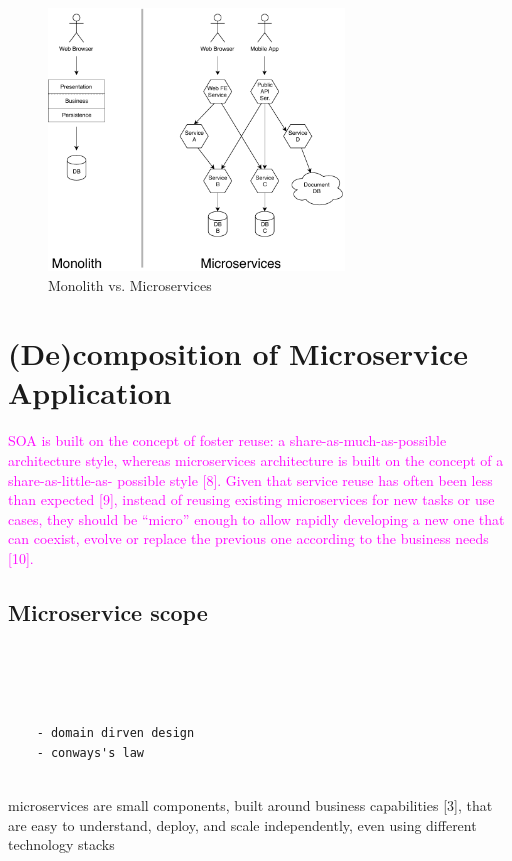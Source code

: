 \documentclass[thesis=M,english,hidelinks]{FITthesis}[2012/10/20]
\begin{document}
\begin{figure}[b]
  \centering
    \includegraphics[width=0.7\textwidth]{images/monolith_vs_microservice.pdf}
    \caption{Monolith vs. Microservices}
    \label{fig:monolith_vs_microservices}
\end{figure}


\section{(De)composition of Microservice Application}




\textcolor{magenta}{SOA is built on the concept of foster reuse: a share-as-much-as-possible architecture style, whereas microservices architecture is built on the concept of a share-as-little-as- possible style [8]. Given that service reuse has often been less than expected [9], instead of reusing existing microservices for new tasks or use cases, they should be “micro” enough to allow rapidly developing a new one that can coexist, evolve or replace the previous one according to the business needs [10].}







\subsection{Microservice scope}


\begin{verbatim}




    - domain dirven design
    - conways's law
    
\end{verbatim}
microservices are small components, built around business capabilities [3], that are easy to understand, deploy, and scale independently, even using different technology stacks
\end{document}
